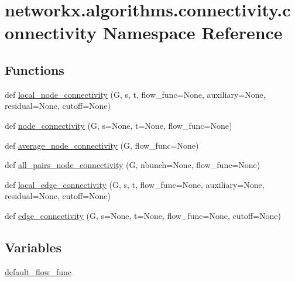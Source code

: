\hypertarget{namespacenetworkx_1_1algorithms_1_1connectivity_1_1connectivity}{}\section{networkx.\+algorithms.\+connectivity.\+connectivity Namespace Reference}
\label{namespacenetworkx_1_1algorithms_1_1connectivity_1_1connectivity}
\subsection*{Functions}
\begin{DoxyCompactItemize}
\item 
def \hyperlink{namespacenetworkx_1_1algorithms_1_1connectivity_1_1connectivity_aca19289f3fde41022449704a6c274c3d}{local\+\_\+node\+\_\+connectivity} (G, s, t, flow\+\_\+func=None, auxiliary=None, residual=None, cutoff=None)
\item 
def \hyperlink{namespacenetworkx_1_1algorithms_1_1connectivity_1_1connectivity_a8db852a84139c51dcd040682fd93d6c2}{node\+\_\+connectivity} (G, s=None, t=None, flow\+\_\+func=None)
\item 
def \hyperlink{namespacenetworkx_1_1algorithms_1_1connectivity_1_1connectivity_a9ca77b87901f9285042c33892b563dd3}{average\+\_\+node\+\_\+connectivity} (G, flow\+\_\+func=None)
\item 
def \hyperlink{namespacenetworkx_1_1algorithms_1_1connectivity_1_1connectivity_a96366ea097779263aabdb8da1d38e624}{all\+\_\+pairs\+\_\+node\+\_\+connectivity} (G, nbunch=None, flow\+\_\+func=None)
\item 
def \hyperlink{namespacenetworkx_1_1algorithms_1_1connectivity_1_1connectivity_a161f08d1d45efbffa4096fe164f3942f}{local\+\_\+edge\+\_\+connectivity} (G, s, t, flow\+\_\+func=None, auxiliary=None, residual=None, cutoff=None)
\item 
def \hyperlink{namespacenetworkx_1_1algorithms_1_1connectivity_1_1connectivity_afdb56b224f01fa955db4b6223c1074af}{edge\+\_\+connectivity} (G, s=None, t=None, flow\+\_\+func=None, cutoff=None)
\end{DoxyCompactItemize}
\subsection*{Variables}
\begin{DoxyCompactItemize}
\item 
\hyperlink{namespacenetworkx_1_1algorithms_1_1connectivity_1_1connectivity_ab2b3805544e8db35b37956f9d3d42794}{default\+\_\+flow\+\_\+func}
\end{DoxyCompactItemize}


